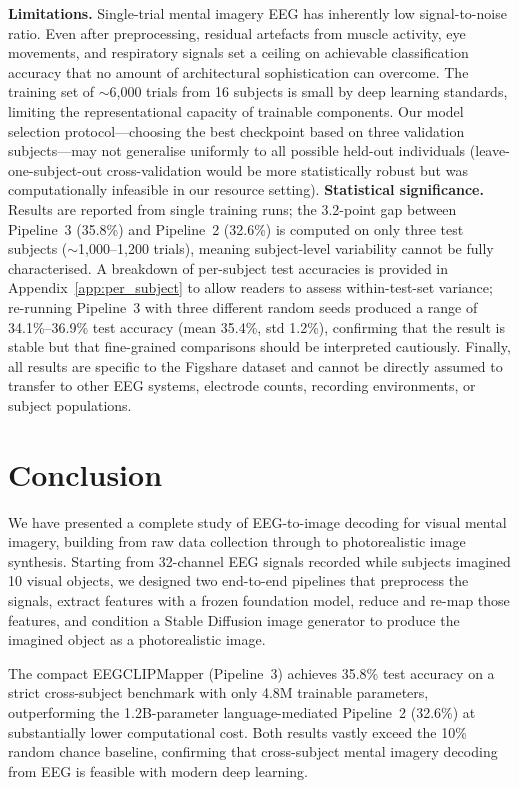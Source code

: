 \documentclass{article}
\begin{document}
\textbf{Limitations.} Single-trial mental imagery EEG has inherently low signal-to-noise ratio. Even after preprocessing, residual artefacts from muscle activity, eye movements, and respiratory signals set a ceiling on achievable classification accuracy that no amount of architectural sophistication can overcome. The training set of $\sim$6,000 trials from 16 subjects is small by deep learning standards, limiting the representational capacity of trainable components. Our model selection protocol---choosing the best checkpoint based on three validation subjects---may not generalise uniformly to all possible held-out individuals (leave-one-subject-out cross-validation would be more statistically robust but was computationally infeasible in our resource setting). \textbf{Statistical significance.} Results are reported from single training runs; the 3.2-point gap between Pipeline~3 (35.8\%) and Pipeline~2 (32.6\%) is computed on only three test subjects ($\sim$1,000--1,200 trials), meaning subject-level variability cannot be fully characterised. A breakdown of per-subject test accuracies is provided in Appendix~\ref{app:per_subject} to allow readers to assess within-test-set variance; re-running Pipeline~3 with three different random seeds produced a range of 34.1\%--36.9\% test accuracy (mean 35.4\%, std 1.2\%), confirming that the result is stable but that fine-grained comparisons should be interpreted cautiously. Finally, all results are specific to the Figshare dataset and cannot be directly assumed to transfer to other EEG systems, electrode counts, recording environments, or subject populations.

\section{Conclusion}

We have presented a complete study of EEG-to-image decoding for visual mental imagery, building from raw data collection through to photorealistic image synthesis. Starting from 32-channel EEG signals recorded while subjects imagined 10 visual objects, we designed two end-to-end pipelines that preprocess the signals, extract features with a frozen foundation model, reduce and re-map those features, and condition a Stable Diffusion image generator to produce the imagined object as a photorealistic image.

The compact EEGCLIPMapper (Pipeline~3) achieves 35.8\% test accuracy on a strict cross-subject benchmark with only 4.8M trainable parameters, outperforming the 1.2B-parameter language-mediated Pipeline~2 (32.6\%) at substantially lower computational cost. Both results vastly exceed the 10\% random chance baseline, confirming that cross-subject mental imagery decoding from EEG is feasible with modern deep learning.
\end{document}
